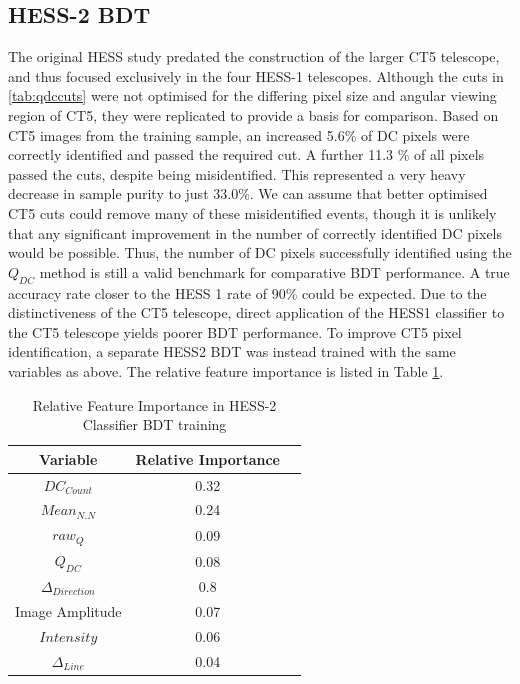 \documentclass{article}
\begin{document}
\subsection{HESS-2 BDT}
The original HESS study predated the construction of the larger CT5 telescope, and thus focused exclusively in the four HESS-1 telescopes. Although the cuts in \ref{tab:qdccuts} were not optimised for the differing pixel size and angular viewing region of CT5, they were replicated to provide a basis for comparison. Based on CT5 images from the training sample, an increased 5.6\% of DC pixels were correctly identified and passed the required cut. A further 11.3 \% of all pixels passed the cuts, despite being misidentified. This represented a very heavy decrease in sample purity to just 33.0\%. We can assume that better optimised CT5 cuts could remove many of these misidentified events, though it is unlikely that any significant improvement in the number of correctly identified DC pixels would be possible. Thus, the number of DC pixels successfully identified using the $Q_{DC}$ method is still a valid benchmark for comparative BDT performance. A true accuracy rate closer to the HESS 1 rate of 90\% could be expected. Due to the distinctiveness of the CT5 telescope, direct application of the HESS1 classifier to the CT5 telescope yields poorer BDT performance. To improve CT5 pixel identification, a separate HESS2 BDT was instead trained with the same variables as above. The relative feature importance is listed in Table \ref{tab:hess2classifier}. 

\begin{table}[h!]
  \centering
  \caption{Relative Feature Importance in HESS-2 Classifier BDT training}
  \label{tab:hess2classifier}
  \begin{tabular}{ccc}
    \toprule
    Variable & Relative Importance\\
    \midrule
    $DC_{Count}$ & 0.32\\
    $Mean_{N.N}$ & 0.24\\
    $raw_{Q}$ & 0.09\\
    $Q_{DC}$ & 0.08\\
    $\Delta_{Direction}$ & 0.8\\
    Image Amplitude & 0.07\\
    $Intensity$ & 0.06\\
    $\Delta_{Line}$ & 0.04\\
    \bottomrule
  \end{tabular}
\end{table}
\end{document}
